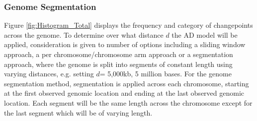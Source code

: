 \subsubsection{Genome Segmentation}
Figure \ref{fig:Histogram_Total} displays the frequency and category of changepoints across the genome. To determine over what distance $d$ the AD model will be applied, consideration is given to number of options including a sliding window approach, a per chromosome/chromosome arm approach or a segmentation approach, where the genome is split into segments of constant length using varying distances, e.g. setting $d$= 5,000kb, 5 million bases. For the genome segmentation method, segmentation is applied across each chromosome, starting at the first observed genomic location and ending at the last observed genomic location. Each segment will be the same length across the chromosome except for the last segment which will be of varying length. 

